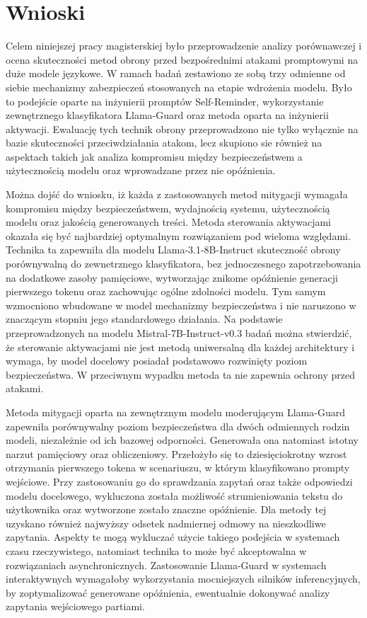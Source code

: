 \section{Wnioski}

Celem niniejszej pracy magisterskiej było przeprowadzenie analizy porównawczej i ocena skuteczności metod obrony przed bezpośrednimi atakami promptowymi na duże modele językowe. W ramach badań zestawiono ze sobą trzy odmienne od siebie mechanizmy zabezpieczeń stosowanych na etapie wdrożenia modelu. Było to podejście oparte na inżynierii promptów Self-Reminder, wykorzystanie zewnętrznego klasyfikatora Llama-Guard oraz metoda oparta na inżynierii aktywacji. Ewaluację tych technik obrony przeprowadzono nie tylko wyłącznie na bazie skuteczności przeciwdziałania atakom, lecz skupiono sie również na aspektach takich jak analiza kompromisu między bezpieczeństwem a użytecznością modelu oraz wprowadzane przez nie opóźnienia.

Można dojść do wniosku, iż każda z zastosowanych metod mitygacji wymagała kompromisu między bezpieczeństwem, wydajnością systemu, użytecznością modelu oraz jakością generowanych treści. Metoda sterowania aktywacjami okazała się być najbardziej optymalnym rozwiązaniem pod wieloma względami. Technika ta zapewniła dla modelu Llama-3.1-8B-Instruct skuteczność obrony porównywalną do zewnetrznego klasyfikatora, bez jednoczesnego zapotrzebowania na dodatkowe zasoby pamięciowe, wytworzając znikome opóźnienie generacji pierwszego tokenu oraz zachowując ogólne zdolności modelu. Tym samym wzmocniono wbudowane w model mechanizmy bezpieczeństwa i nie naruszono w znaczącym stopniu jego standardowego działania. Na podstawie przeprowadzonych na modelu Mistral-7B-Instruct-v0.3 badań można stwierdzić, że sterowanie aktywacjami nie jest metodą uniwersalną dla każdej architektury i wymaga, by model docelowy posiadał podstawowo rozwinięty poziom bezpieczeństwa. W przeciwnym wypadku metoda ta nie zapewnia ochrony przed atakami.

Metoda mitygacji oparta na zewnętrznym modelu moderującym Llama-Guard zapewniła porównywalny poziom bezpieczeństwa dla dwóch odmiennych rodzin modeli, niezależnie od ich bazowej odporności. Generowała ona natomiast istotny narzut pamięciowy oraz obliczeniowy. Przełożyło się to dziesięciokrotny wzrost otrzymania pierwszego tokena w scenariuszu, w którym klasyfikowano prompty wejściowe. Przy zastosowaniu go do sprawdzania zapytań oraz także odpowiedzi modelu docelowego, wykluczona została możliwość strumieniowania tekstu do użytkownika oraz wytworzone zostało znaczne opóźnienie. Dla metody tej uzyskano również najwyższy odsetek nadmiernej odmowy na nieszkodliwe zapytania. Aspekty te mogą wykluczać użycie takiego podejścia w systemach czasu rzeczywistego, natomiast technika to może być akceptowalna w rozwiązaniach asynchronicznych. Zastosowanie Llama-Guard w systemach interaktywnych wymagałoby wykorzystania mocniejszych silników inferencyjnych, by zoptymalizować generowane opóźnienia, ewentualnie dokonywać analizy zapytania wejściowego partiami.

